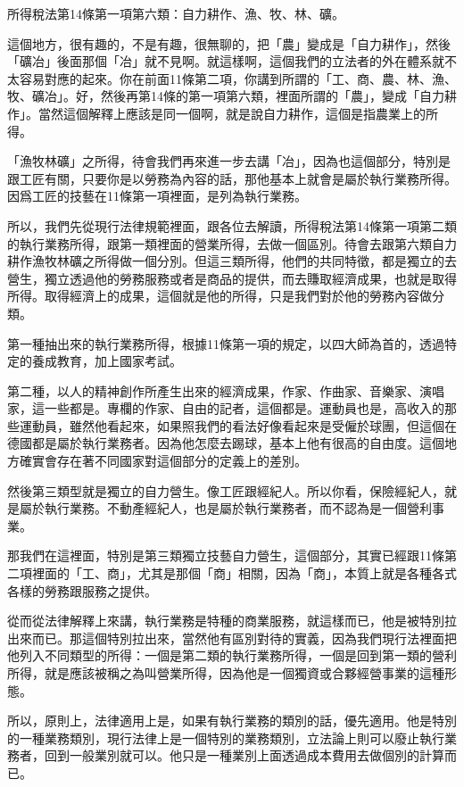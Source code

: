 \documentclass[]{ctexbook}
\begin{document}
所得稅法第14條第一項第六類：自力耕作、漁、牧、林、礦。

這個地方，很有趣的，不是有趣，很無聊的，把「農」變成是「自力耕作」，然後「礦冶」後面那個「冶」就不見啊。就這樣啊，這個我們的立法者的外在體系就不太容易對應的起來。你在前面11條第二項，你講到所謂的「工、商、農、林、漁、牧、礦冶」。好，然後再第14條的第一項第六類，裡面所謂的「農」，變成「自力耕作」。當然這個解釋上應該是同一個啊，就是說自力耕作，這個是指農業上的所得。

「漁牧林礦」之所得，待會我們再來進一步去講「冶」，因為也這個部分，特別是跟工匠有關，只要你是以勞務為內容的話，那他基本上就會是屬於執行業務所得。因爲工匠的技藝在11條第一項裡面，是列為執行業務。

所以，我們先從現行法律規範裡面，跟各位去解讀，所得稅法第14條第一項第二類的執行業務所得，跟第一類裡面的營業所得，去做一個區別。待會去跟第六類自力耕作漁牧林礦之所得做一個分別。但這三類所得，他們的共同特徵，都是獨立的去營生，獨立透過他的勞務服務或者是商品的提供，而去賺取經濟成果，也就是取得所得。取得經濟上的成果，這個就是他的所得，只是我們對於他的勞務內容做分類。

第一種抽出來的執行業務所得，根據11條第一項的規定，以四大師為首的，透過特定的養成教育，加上國家考試。

第二種，以人的精神創作所產生出來的經濟成果，作家、作曲家、音樂家、演唱家，這一些都是。專欄的作家、自由的記者，這個都是。運動員也是，高收入的那些運動員，雖然他看起來，如果照我們的看法好像看起來是受僱於球團，但這個在德國都是屬於執行業務者。因為他怎麼去踢球，基本上他有很高的自由度。這個地方確實會存在著不同國家對這個部分的定義上的差別。

然後第三類型就是獨立的自力營生。像工匠跟經紀人。所以你看，保險經紀人，就是屬於執行業務。不動產經紀人，也是屬於執行業務者，而不認為是一個營利事業。

那我們在這裡面，特別是第三類獨立技藝自力營生，這個部分，其實已經跟11條第二項裡面的「工、商」，尤其是那個「商」相關，因為「商」，本質上就是各種各式各樣的勞務跟服務之提供。

從而從法律解釋上來講，執行業務是特種的商業服務，就這樣而已，他是被特別拉出來而已。那這個特別拉出來，當然他有區別對待的實義，因為我們現行法裡面把他列入不同類型的所得：一個是第二類的執行業務所得，一個是回到第一類的營利所得，就是應該被稱之為叫營業所得，因為他是一個獨資或合夥經營事業的這種形態。

所以，原則上，法律適用上是，如果有執行業務的類別的話，優先適用。他是特別的一種業務類別，現行法律上是一個特別的業務類別，立法論上則可以廢止執行業務者，回到一般業別就可以。他只是一種業別上面透過成本費用去做個別的計算而已。
\end{document}
